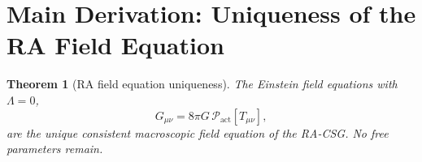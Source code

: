 \documentclass[11pt,a4paper]{article}
\newtheorem{theorem}{Theorem}[section]
\newcommand{\Pact}{\mathcal{P}_{\mathrm{act}}}
\begin{document}
\section{Main Derivation: Uniqueness of the RA Field Equation}
\label{sec:main}

\begin{theorem}[RA field equation uniqueness]
\label{thm:main}
The Einstein field equations with $\Lambda = 0$,
\begin{equation}
  G_{\mu\nu} = 8\pi G\,\Pact\!\left[T_{\mu\nu}\right],
  \label{eq:RA_EFE}
\end{equation}
are the \emph{unique} consistent macroscopic field equation of the
RA-CSG. No free parameters remain.
\end{theorem}
\end{document}
